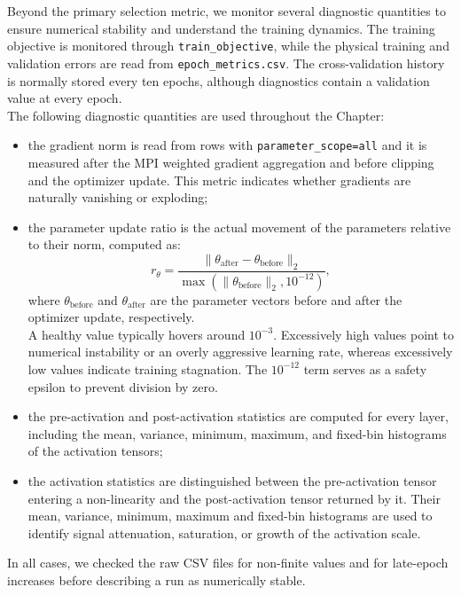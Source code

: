 Beyond the primary selection metric, we monitor several diagnostic quantities to ensure numerical stability and understand the training dynamics. The training objective is monitored through \texttt{train\_objective}, while the physical training and validation errors are read from \texttt{epoch\_metrics.csv}. The cross-validation history is normally stored every ten epochs, although diagnostics contain a validation value at every epoch.\\

The following diagnostic quantities are used throughout the Chapter:
\begin{itemize}
    \item[-] the gradient norm is read from rows with \texttt{parameter\_scope=all} and it is measured after the MPI weighted gradient aggregation and before clipping and the optimizer update. This metric indicates whether gradients are naturally vanishing or exploding;
    \item[-] the parameter update ratio is the actual movement of the parameters relative to their norm, computed as:
    \begin{equation}
    r_{\theta} =
    \frac{\lVert\theta_{\mathrm{after}}-\theta_{\mathrm{before}}\rVert_2}
    {\max\left(\lVert\theta_{\mathrm{before}}\rVert_2,10^{-12}\right)},
    \label{eq:04_update_ratio}
\end{equation}
    where $\theta_{\mathrm{before}}$ and $\theta_{\mathrm{after}}$ are the parameter vectors before and after the optimizer update, respectively.\\
    A healthy value typically hovers around $10^{-3}$. Excessively high values point to numerical instability or an overly aggressive learning rate, whereas excessively low values indicate training stagnation. The $10^{-12}$ term serves as a safety epsilon to prevent division by zero.
    \item[-] the pre-activation and post-activation statistics are computed for every layer, including the mean, variance, minimum, maximum, and fixed-bin histograms of the activation tensors;
    \item[-] the activation statistics are distinguished between the pre-activation tensor entering a non-linearity and the post-activation tensor returned by it. Their mean, variance, minimum, maximum and fixed-bin histograms are used to identify signal attenuation, saturation, or growth of the activation scale.
\end{itemize}
In all cases, we checked the raw CSV files for non-finite values and for late-epoch increases before describing a run as numerically stable.

